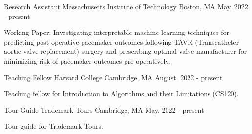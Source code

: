 
\begin{cventries}

  \cventry
    {Research Assistant} %
    {Massachusetts Institute of Technology} %
    {Boston, MA} %
    {May. 2022 - present} %
    {
      \begin{cvitems} %
        \item {Working Paper: Investigating interpretable machine learning techniques for 
        predicting post-operative pacemaker outcomes following TAVR
        (Transcatheter aortic valve replacement) surgery and prescribing optimal 
        valve manufacturer for minimizing risk of pacemaker outcomes pre-operatively.}
      \end{cvitems}
    }

\cventry
    {Teaching Fellow} %
    {Harvard College} %
    {Cambridge, MA} %
    {August. 2022 - present} %
    {
      \begin{cvitems} %
        \item {Teaching fellow for Introduction to Algorithms and their Limitations (CS120).}
      \end{cvitems}
    }
    
\cventry
    {Tour Guide}
    {Trademark Tours}
    {Cambridge, MA}
    {May. 2022 - present}
    {
      \begin{cvitems}
        \item{Tour guide for Trademark Tours.}
      \end{cvitems}
    }


\end{cventries}
